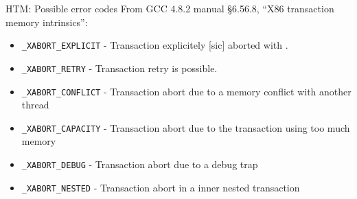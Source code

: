 \documentclass[xcolor=dvipsnames]{beamer}
\begin{document}
\begin{frame}{HTM: Possible \xabort error codes}
	From GCC 4.8.2 manual \S 6.56.8, ``X86 transaction memory intrinsics'':
	\begin{itemize}
		\item {\tt \_XABORT\_EXPLICIT} - Transaction explicitely [sic] aborted with \xabort.
		\item {\tt \_XABORT\_RETRY} - Transaction retry is possible.
		\item {\tt \_XABORT\_CONFLICT} - Transaction abort due to a memory conflict with another thread
		\item {\tt \_XABORT\_CAPACITY} - Transaction abort due to the transaction using too much memory
		\item {\tt \_XABORT\_DEBUG} - Transaction abort due to a debug trap
		\item {\tt \_XABORT\_NESTED} - Transaction abort in a inner nested transaction
	\end{itemize}
\end{frame}



\end{document}
